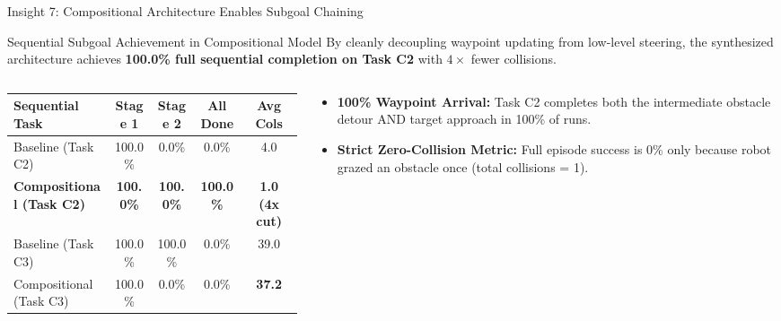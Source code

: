 \documentclass[aspectratio=169, 10pt]{beamer}
\begin{document}
\begin{frame}{Insight 7: Compositional Architecture Enables Subgoal Chaining}
  \begin{block}{Sequential Subgoal Achievement in Compositional Model}
    By cleanly decoupling waypoint updating from low-level steering, the synthesized architecture achieves \textbf{100.0\% full sequential completion on Task C2} with $4\times$ fewer collisions.
  \end{block}
  \vspace{-0.2cm}
  \begin{columns}[T]
    \begin{column}{0.54\textwidth}
      \setlength{\tabcolsep}{2pt}
      \begin{table}
        \centering
        \scriptsize
        \begin{tabular}{lcccc}
          \toprule
          \textbf{Sequential Task} & \textbf{Stage 1} & \textbf{Stage 2} & \textbf{All Done} & \textbf{Avg Cols} \\
          \midrule
          Baseline (Task C2) & 100.0\% & 0.0\% & 0.0\% & 4.0 \\
          \textbf{Compositional (Task C2)} & \textbf{100.0\%} & \textbf{100.0\%} & \textbf{100.0\%} & \textbf{1.0 (4x cut)} \\
          \midrule
          Baseline (Task C3) & 100.0\% & 100.0\% & 0.0\% & 39.0 \\
          Compositional (Task C3) & 100.0\% & 0.0\% & 0.0\% & \textbf{37.2} \\
          \bottomrule
        \end{tabular}
      \end{table}
    \end{column}
    \begin{column}{0.44\textwidth}
      \begin{itemize}
        \item \textbf{100\% Waypoint Arrival:} Task C2 completes both the intermediate obstacle detour AND target approach in 100\% of runs.
        \item \textbf{Strict Zero-Collision Metric:} Full episode success is 0\% only because robot grazed an obstacle once (total collisions = 1).
      \end{itemize}
    \end{column}
  \end{columns}
\end{frame}
\end{document}
